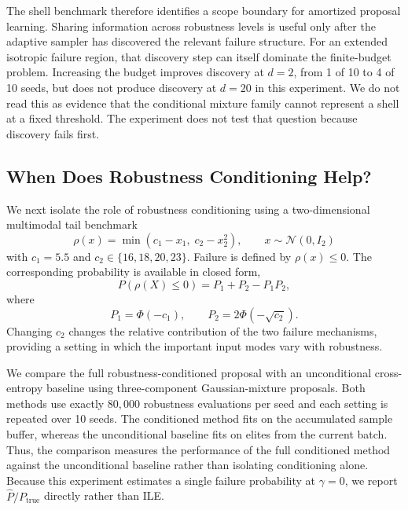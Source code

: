 \documentclass[twoside,11pt]{article}
\begin{document}
The shell benchmark therefore identifies a scope boundary for amortized proposal learning. Sharing information across robustness levels is useful only after the adaptive sampler has discovered the relevant failure structure. For an extended isotropic failure region, that discovery step can itself dominate the finite-budget problem. Increasing the budget improves discovery at $d=2$, from 1 of 10 to 4 of 10 seeds, but does not produce discovery at $d=20$ in this experiment. We do not read this as evidence that the conditional mixture family cannot represent a shell at a fixed threshold. The experiment does not test that question because discovery fails first.

\subsection{When Does Robustness Conditioning Help?}
\label{sec:conditioning-results}

We next isolate the role of robustness conditioning using a two-dimensional multimodal tail benchmark
\[
    \rho(x)
    =
    \min\!\left(c_1-x_1,\; c_2-x_2^2\right),
    \qquad
    x\sim\mathcal N(0,I_2)
\]
with $c_1=5.5$ and $c_2\in\{16,18,20,23\}$. Failure is defined by $\rho(x)\leq 0$. The corresponding probability is available in closed form,
\[
    P(\rho(X)\leq 0)
    =
    P_1 + P_2 - P_1P_2,
\]
where
\[
    P_1=\Phi(-c_1),
    \qquad
    P_2=2\Phi(-\sqrt{c_2}).
\]
Changing $c_2$ changes the relative contribution of the two failure mechanisms, providing a setting in which the important input modes vary with robustness.

We compare the full robustness-conditioned proposal with an unconditional cross-entropy baseline using three-component Gaussian-mixture proposals. Both methods use exactly $80{,}000$ robustness evaluations per seed and each setting is repeated over 10 seeds. The conditioned method fits on the accumulated sample buffer, whereas the unconditional baseline fits on elites from the current batch. Thus, the comparison measures the performance of the full conditioned method against the unconditional baseline rather than isolating conditioning alone. Because this experiment estimates a single failure probability at $\gamma=0$, we report $\widehat P/P_{\mathrm{true}}$ directly rather than ILE.
\end{document}
